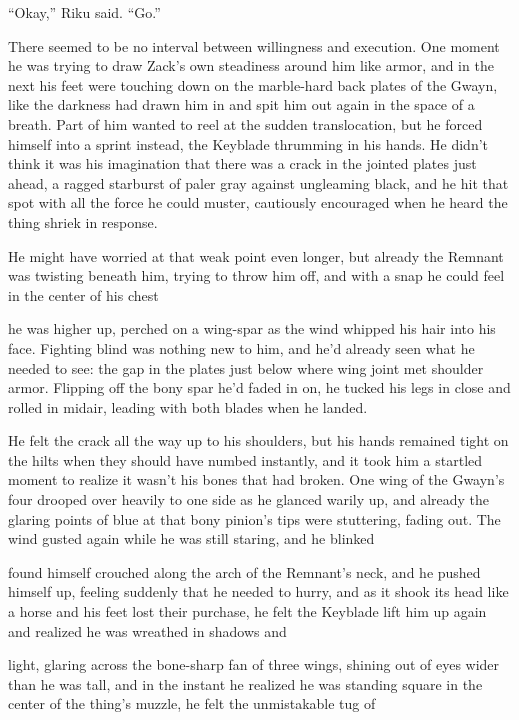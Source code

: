 ``Okay,'' Riku said. ``Go.''

There seemed to be no interval between willingness and execution. One moment he was trying to draw Zack's own steadiness around him like armor, and in the next his feet were touching down on the marble-hard back plates of the Gwayn, like the darkness had drawn him in and spit him out again in the space of a breath. Part of him wanted to reel at the sudden translocation, but he forced himself into a sprint instead, the Keyblade thrumming in his hands. He didn't think it was his imagination that there was a crack in the jointed plates just ahead, a ragged starburst of paler gray against ungleaming black, and he hit that spot with all the force he could muster, cautiously encouraged when he heard the thing shriek in response.

He might have worried at that weak point even longer, but already the Remnant was twisting beneath him, trying to throw him off, and with a snap he could feel in the center of his chest\textemdash 

\textemdash he was higher up, perched on a wing-spar as the wind whipped his hair into his face. Fighting blind was nothing new to him, and he'd already seen what he needed to see: the gap in the plates just below where wing joint met shoulder armor. Flipping off the bony spar he'd faded in on, he tucked his legs in close and rolled in midair, leading with both blades when he landed.

He felt the crack all the way up to his shoulders, but his hands remained tight on the hilts when they should have numbed instantly, and it took him a startled moment to realize it wasn't his bones that had broken. One wing of the Gwayn's four drooped over heavily to one side as he glanced warily up, and already the glaring points of blue at that bony pinion's tips were stuttering, fading out. The wind gusted again while he was still staring, and he blinked\textemdash 

\textemdash found himself crouched along the arch of the Remnant's neck, and he pushed himself up, feeling suddenly that he needed to hurry, and as it shook its head like a horse and his feet lost their purchase, he felt the Keyblade lift him up again and realized he was wreathed in shadows and\textemdash 

\textemdash light, glaring across the bone-sharp fan of three wings, shining out of eyes wider than he was tall, and in the instant he realized he was standing square in the center of the thing's muzzle, he felt the unmistakable tug of\textemdash 

